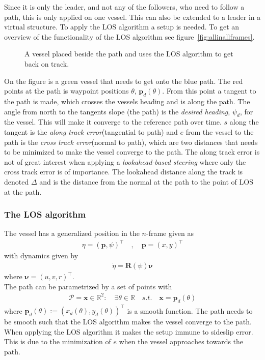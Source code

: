 Since it is only the leader, and not any of the followers, who need to follow a path, this is only applied on one vessel. This can also be extended to a leader in a virtual structure. To apply the \ac{LOS} algorithm a setup is needed. To get an overview of the functionality of the \ac{LOS} algorithm see figure~\vref{fig:allinallframes}.
\begin{figure}[htbp]
	\centering
	
	\caption{A vessel placed beside the path and uses the \ac{LOS} algorithm to get back on track.}
	\label{fig:allinallframes}
\end{figure}
On the figure is a green vessel that needs to get onto the blue path. The red points at the path is waypoint positions $\theta$, $\textbf{p}_d(\theta)$. From this point a tangent to the path is made, which crosses the vessels heading and is along the path. The angle from north to the tangents slope (the path) is the \textit{desired heading}, $\psi_d$, for the vessel. This will make it converge to the reference path over time. $s$ along the tangent is the \textit{along track error}(tangential to path) and $e$ from the vessel to the path is the \textit{cross track error}(normal to path), which are two distances that needs to be minimized to make the vessel converge to the path. The along track error is not of great interest when applying a \textit{lookahead-based steering} where only the cross track error is of importance. The lookahead distance along the track is denoted $\Delta$ and is the distance from the normal at the path to the point of \ac{LOS} at the path.

\subsubsection{The \ac{LOS} algorithm}
The vessel has a generalized position in the ${n}$-frame given as
\begin{align}
\eta = (\textbf{p},\psi)^\top\quad , \quad \textbf{p} = (x,y)^\top
\end{align}
with dynamics given by
\begin{align}
\dot{\eta} = \textbf{R}(\psi)\boldsymbol{\nu}
\end{align}
where $\boldsymbol{\nu} = (u,v,r)^\top$.\\
The path can be parametrized by a set of points with
\begin{align}
\mathcal{P} = {\textbf{x}}\in\mathds{R}^2 : \quad \exists \theta \in \mathds{R} \quad s.t. \quad \textbf{x} = \textbf{p}_d(\theta)
\end{align}
where $\textbf{p}_d(\theta) := (x_d(\theta),y_d(\theta))^\top$ is a smooth function. The path needs to be smooth such that the \ac{LOS} algorithm makes the vessel converge to the path. When applying the \ac{LOS} algorithm it makes the setup immune to sideslip error. This is due to the minimization of $e$ when the vessel approaches towards the path.

